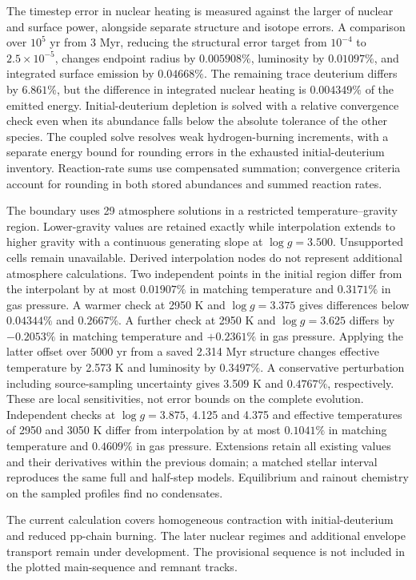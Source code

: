 \documentclass[11pt,letterpaper]{article}
\begin{document}
The timestep error in nuclear heating is measured against the larger of
nuclear and surface power, alongside separate structure and isotope errors.
A comparison over $10^5$ yr from 3 Myr, reducing the structural error target
from $10^{-4}$ to $2.5\times10^{-5}$, changes endpoint radius by $0.005908\%$,
luminosity by $0.01097\%$, and integrated surface emission by $0.04668\%$.
The remaining trace deuterium differs by $6.861\%$, but the difference in
integrated nuclear heating is $0.004349\%$ of the emitted energy.
Initial-deuterium depletion is solved with a relative convergence check even
when its abundance falls below the absolute tolerance of the other species.
The coupled solve resolves weak hydrogen-burning increments, with a separate
energy bound for rounding errors in the exhausted initial-deuterium inventory.
Reaction-rate sums use compensated summation; convergence criteria account
for rounding in both stored abundances and summed reaction rates.

The boundary uses 29 atmosphere solutions in a restricted temperature--gravity
region. Lower-gravity values are retained exactly while interpolation extends
to higher gravity with a continuous generating slope at $\log g=3.500$.
Unsupported cells remain unavailable. Derived interpolation nodes do not
represent additional atmosphere calculations. Two independent points in the
initial region differ from the interpolant by at most $0.01907\%$ in matching
temperature and $0.3171\%$ in gas pressure. A warmer check at 2950 K and
$\log g=3.375$ gives differences below $0.04344\%$ and $0.2667\%$.
A further check at 2950 K and $\log g=3.625$ differs by $-0.2053\%$ in
matching temperature and $+0.2361\%$ in gas pressure. Applying the latter
offset over 5000 yr from a saved 2.314 Myr structure changes effective
temperature by 2.573 K and luminosity by $0.3497\%$. A conservative
perturbation including source-sampling uncertainty gives 3.509 K and
$0.4767\%$, respectively. These are local sensitivities, not error bounds
on the complete evolution. Independent checks at $\log g=3.875$, 4.125 and 4.375
and effective temperatures of 2950 and 3050 K differ from interpolation by
at most $0.1041\%$ in matching temperature and $0.4609\%$ in gas pressure.
Extensions retain all existing values and their derivatives within the previous
domain; a matched stellar interval reproduces the same full and half-step models.
Equilibrium and rainout chemistry on the sampled
profiles find no condensates.

The current calculation covers homogeneous contraction with initial-deuterium
and reduced pp-chain burning.
The later nuclear regimes and additional envelope transport remain under
development. The provisional sequence is not included in the plotted
main-sequence and remnant tracks.
\end{document}
